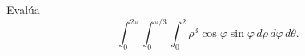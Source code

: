 Evalúa
\[
\int_0^{2\pi}\int_0^{\pi/3}\int_0^2
\rho^3\cos\varphi\sin\varphi\,d\rho\,d\varphi\,d\theta.
\]
